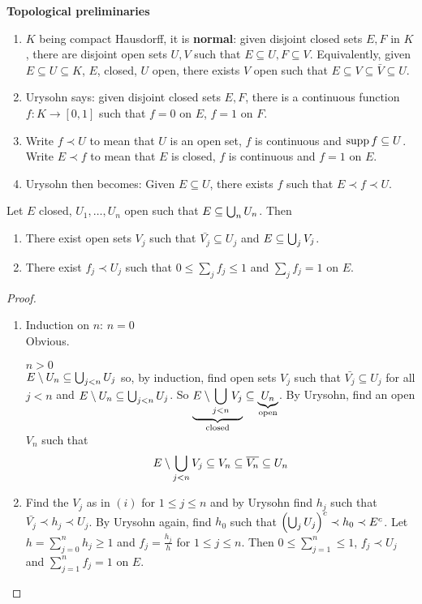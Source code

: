 \documentclass{article}
\begin{document}
{\bf Topological preliminaries}
\begin{enumerate}
  \item $K$ being compact Hausdorff, it is {\bf normal}: given disjoint closed sets $E, F$ in $K$, there are disjoint open sets $U, V$ such that $E \subseteq U, F \subseteq V$. Equivalently, given $E \subseteq U \subseteq K$, $E$, closed, $U$ open, there exists $V$ open such that $E \subseteq V \subseteq \bar V \subseteq U$.
  \item Urysohn says: given disjoint closed sets $E, F$, there is a continuous function $f : K \to [0, 1]$ such that $f = 0$ on $E$, $f = 1$ on $F$.
  \item Write $f \prec U$ to mean that $U$ is an open set, $f$ is continuous and $\operatorname{supp} f \subseteq U$. Write $E \prec f$ to mean that $E$ is closed, $f$ is continuous and $f = 1$ on $E$.
  \item Urysohn then becomes: Given $E \subseteq U$, there exists $f$ such that $E \prec f \prec U$.
\end{enumerate}

\begin{lem}\label{lem:partition-of-unity}
  Let $E$ closed, $U_1, \dots, U_n$ open such that $E \subseteq \bigcup_n U_n$. Then
  \begin{enumerate}
    \item There exist open sets $V_j$ such that $\bar{V_j} \subseteq U_j$ and $E \subseteq \bigcup_j V_j$.
    \item There exist $f_j \prec U_j$ such that $0 \le \sum_j f_j \le 1$ and $\sum_j f_j = 1$ on $E$.
  \end{enumerate}
\end{lem}
\begin{proof}~
  \begin{enumerate}
    \item Induction on $n$:
    {\bf $n = 0$} \\
    Obvious.

    {\bf $n > 0$} \\
    $E \setminus U_n \subseteq \bigcup_{j < n} U_j$ so, by induction, find open sets $V_j$ such that $\bar{V_j} \subseteq U_j$ for all $j < n$ and $E \setminus U_n \subseteq \bigcup_{j < n} U_j$. So $\underbrace{E \setminus \bigcup_{j < n} V_j}_{\text{closed}} \subseteq \underbrace{U_n}_{\text{open}}$. By Urysohn, find an open $V_n$ such that
    $$E \setminus \bigcup_{j < n} V_j \subseteq V_n \subseteq \overline{V_n} \subseteq U_n$$
    \item Find the $V_j$ as in $(i)$ for $1 \le j \le n$ and by Urysohn find $h_j$ such that $\bar{V_j} \prec h_j \prec U_j$. By Urysohn again, find $h_0$ such that $\left(\bigcup_j U_j\right)^c \prec h_0 \prec E^c$. Let $h = \sum_{j = 0}^n h_j \ge 1$ and $f_j = \frac{h_j}h$ for $1 \le j \le n$. Then $0 \le \sum_{j = 1}^n \le 1$, $f_j \prec U_j$ and $\sum_{j = 1}^n f_j = 1$ on $E$.
  \end{enumerate}
\end{proof}
\end{document}
